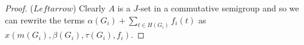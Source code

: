 \documentclass[12pt]{article}
\theoremstyle{plain}
\theoremstyle{definition}
\begin{document}
\begin{proof}
  ($Leftarrow$)
  Clearly $A$ is a $J$-set in a commutative semigroup and so we can rewrite the terms $\alpha(G_i) + \sum_{t \in H(G_i)} f_i(t)$ as $x(m(G_i), \beta(G_i), \tau(G_i), f_i)$. 
\end{proof}





\end{document}
